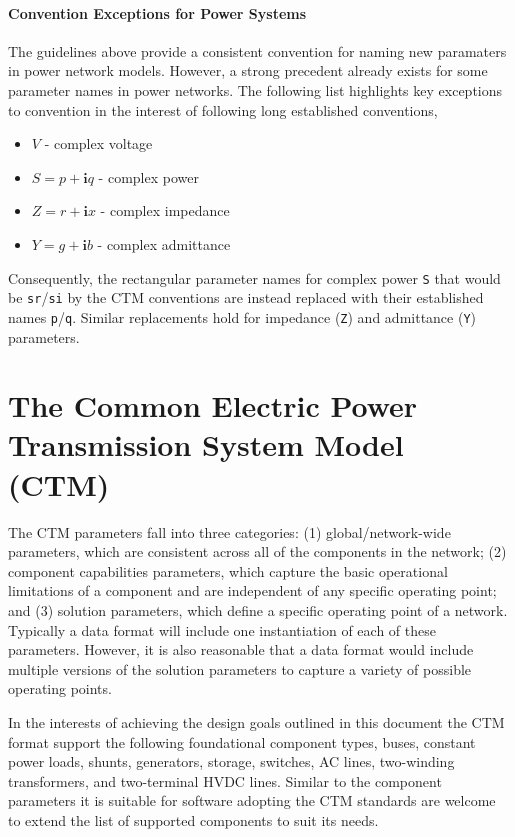\documentclass{article}
\begin{document}
\paragraph{Convention Exceptions for Power Systems}
%
The guidelines above provide a consistent convention for naming new paramaters in power network models.  However, a strong precedent already exists for some parameter names in power networks.  The following list highlights key exceptions to convention in the interest of following long established conventions,
%
\begin{itemize}
    \item $V$ - complex voltage 
    \item $S = p + \bm i q$ - complex power 
    \item $Z = r + \bm i x$ - complex impedance
    \item $Y = g + \bm i b$ - complex admittance
\end{itemize}
%
Consequently, the rectangular parameter names for complex power \texttt{S} that would be \texttt{sr}/\texttt{si} by the CTM conventions are instead replaced with their established names \texttt{p}/\texttt{q}.  Similar replacements hold for impedance (\texttt{Z}) and admittance (\texttt{Y}) parameters.


\section{The Common Electric Power Transmission System Model (CTM)}

The CTM parameters fall into three categories: (1) global/network-wide parameters, which are consistent across all of the components in the network; (2) component capabilities parameters, which capture the basic operational limitations of a component and are independent of any specific operating point; and (3) solution parameters, which define a specific operating point of a network.  Typically a data format will include one instantiation of each of these parameters.  However, it is also reasonable that a data format would include multiple versions of the solution parameters to capture a variety of possible operating points.

In the interests of achieving the design goals outlined in this document the CTM format support the following foundational component types, buses, constant power loads, shunts, generators, storage, switches, AC lines, two-winding transformers, and two-terminal HVDC lines.  Similar to the component parameters it is suitable for software adopting the CTM standards are welcome to extend the list of supported components to suit its needs.
%
\end{document}
